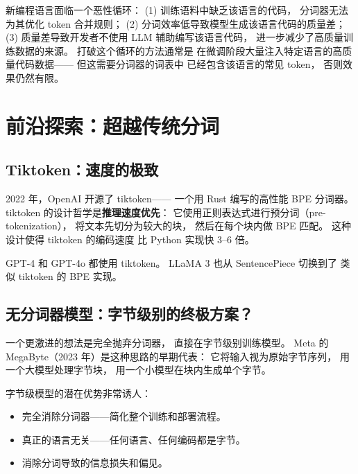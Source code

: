 \begin{warnbox}[新语言的恶性循环]
新编程语言面临一个恶性循环：
(1) 训练语料中缺乏该语言的代码，
分词器无法为其优化 token 合并规则；
(2) 分词效率低导致模型生成该语言代码的质量差；
(3) 质量差导致开发者不使用 LLM 辅助编写该语言代码，
进一步减少了高质量训练数据的来源。
打破这个循环的方法通常是
在微调阶段大量注入特定语言的高质量代码数据——
但这需要分词器的词表中
已经包含该语言的常见 token，
否则效果仍然有限。
\end{warnbox}

\section{前沿探索：超越传统分词}

\subsection{Tiktoken：速度的极致}

2022 年，OpenAI 开源了 tiktoken——
一个用 Rust 编写的高性能 BPE 分词器。
tiktoken 的设计哲学是\textbf{推理速度优先}：
它使用正则表达式进行预分词（pre-tokenization），
将文本先切分为较大的块，
然后在每个块内做 BPE 匹配。
这种设计使得 tiktoken 的编码速度
比 Python 实现快 3--6 倍。

GPT-4 和 GPT-4o 都使用 tiktoken。
LLaMA 3 也从 SentencePiece 切换到了
类似 tiktoken 的 BPE 实现。

\subsection{无分词器模型：字节级别的终极方案？}

一个更激进的想法是完全抛弃分词器，
直接在字节级别训练模型。
Meta 的 MegaByte（2023 年）是这种思路的早期代表：
它将输入视为原始字节序列，
用一个大模型处理字节块，
用一个小模型在块内生成单个字节。

字节级模型的潜在优势非常诱人：
\begin{itemize}[noitemsep]
  \item 完全消除分词器——简化整个训练和部署流程。
  \item 真正的语言无关——任何语言、任何编码都是字节。
  \item 消除分词导致的信息损失和偏见。
\end{itemize}

